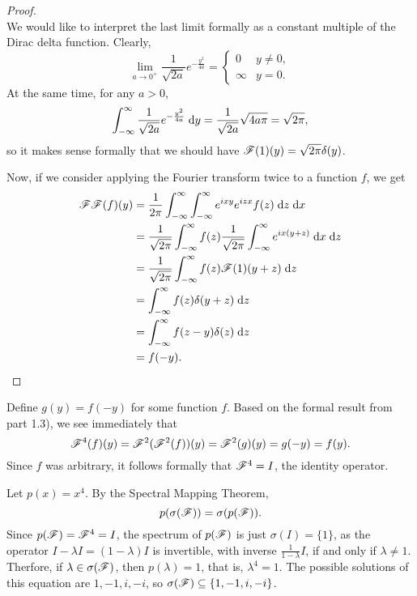 \documentclass{homework}
\begin{document}
\begin{arabicparts}
\begin{proof}
\begin{equation}
			\end{equation}
			We would like to interpret the last limit formally as a constant multiple of the Dirac delta function. Clearly,
			\begin{equation}
				\lim_{a\to0^+} \frac{1}{\sqrt{2a}}e^{-\frac{y^2}{4a}} = \begin{cases}
					0 & y \ne 0, \\
					\infty & y = 0.
				\end{cases}
			\end{equation}
			At the same time, for any $a > 0$,
			\begin{equation}
				\int_{-\infty}^\infty \frac{1}{\sqrt{2a}}e^{-\frac{y^2}{4a}}\;\text{d} y = \frac{1}{\sqrt{2a}}\sqrt{4a\pi} = \sqrt{2\pi},
			\end{equation}
			so it makes sense formally that we should have $\mathscr{F}(1)(y) = \sqrt{2\pi}\delta(y)$.
			
			Now, if we consider applying the Fourier transform twice to a function $f$, we get
			\begin{align}
				\mathscr{F}\mathscr{F}(f)(y) &= \frac{1}{2\pi}\int_{-\infty}^\infty\int_{-\infty}^\infty e^{ixy}e^{izx} f(z)\;\text{d} z\;\text{d} x \\
				&= \frac{1}{\sqrt{2\pi}}\int_{-\infty}^\infty f(z) \frac{1}{\sqrt{2\pi}}\int_{-\infty}^\infty e^{ix(y+z)}\;\text{d} x\;\text{d} z\\
				&= \frac{1}{\sqrt{2\pi}}\int_{-\infty}^\infty f(z) \mathscr{F}(1)(y+z)\;\text{d} z \\
				&= \int_{-\infty}^\infty f(z)\delta(y+z)\;\text{d} z \\
				&= \int_{-\infty}^\infty f(z-y)\delta(z)\;\text{d} z \\
				&= f(-y).
			\end{align}
		\end{proof}
		
		\questionpart Define $g(y) = f(-y)$ for some function $f$. Based on the formal result from part 1.3), we see immediately that
		\begin{equation}
			\mathscr{F}^4(f)(y) = \mathscr{F}^2(\mathscr{F}^2(f))(y) = \mathscr{F}^2(g)(y) = g(-y) = f(y).
		\end{equation}
		Since $f$ was arbitrary, it follows formally that $\mathscr{F}^4 = I$, the identity operator.
		
		\questionpart Let $p(x) = x^4$. By the Spectral Mapping Theorem,
		\begin{equation}
			p(\sigma(\mathscr{F})) = \sigma(p(\mathscr{F})).
		\end{equation}
		Since $p(\mathscr{F}) = \mathscr{F}^4 = I$, the spectrum of $p(\mathscr{F})$ is just $\sigma(I) = \{1\}$, as the operator $I - \lambda I = (1-\lambda)I$ is invertible, with inverse $\frac{1}{1-\lambda}I$, if and only if $\lambda \ne 1$. Therfore, if $\lambda \in \sigma(\mathscr{F})$, then $p(\lambda) = 1$, that is, $\lambda^4 = 1$. The possible solutions of this equation are $1,-1,i,-i$, so $\sigma(\mathscr{F}) \subseteq \{1,-1,i,-i\}$.
		

\end{arabicparts}
\end{document}
